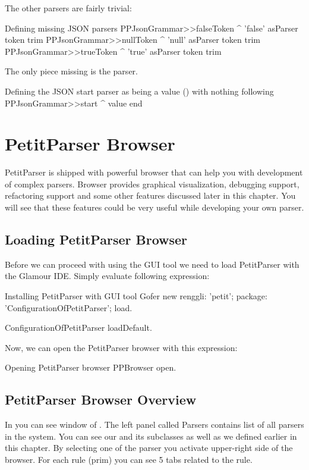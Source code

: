 \documentclass[a4paper,10pt,twoside]{book}
\begin{document}
The other parsers are fairly trivial:

\begin{script}{Defining missing JSON parsers}
PPJsonGrammar>>falseToken
  ^ 'false' asParser token trim
PPJsonGrammar>>nullToken
  ^ 'null' asParser token trim
PPJsonGrammar>>trueToken
  ^ 'true' asParser token trim
\end{script}

The only piece missing is the  parser.

\begin{script}{Defining the JSON start parser as being a value () with nothing following}
PPJsonGrammar>>start
  ^ value end
\end{script}


\section{PetitParser Browser}
PetitParser is shipped with powerful browser that can help you with development of complex parsers.
Browser provides graphical visualization, debugging support, refactoring support and some other features discussed later in this chapter. 
You will see that these features could be very useful while developing your own parser.

\subsection{Loading PetitParser Browser}
Before we can proceed with using the GUI tool we need to load PetitParser with the Glamour IDE.
Simply evaluate following expression:

\begin{script}{Installing PetitParser with GUI tool}
Gofer new
  renggli: 'petit';
  package: 'ConfigurationOfPetitParser';
  load.

ConfigurationOfPetitParser loadDefault.
\end{script}

\noindent Now, we can open the PetitParser browser with this expression:
\begin{script}{Opening PetitParser browser}
PPBrowser open.
\end{script}

\subsection{PetitParser Browser Overview}
In  you can see window of . 
The left panel called Parsers contains list of all parsers in the system.
You can see our  and its subclasses as well as  we defined earlier in this chapter.
By selecting one of the parser you activate upper-right side of the browser.
For each rule (\eg prim) you can see 5 tabs related to the rule.
\end{document}
